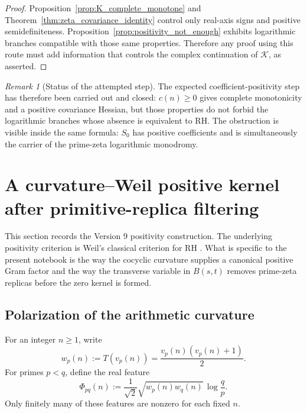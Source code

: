 \documentclass[11pt]{amsart}
\numberwithin{equation}{section}
\theoremstyle{plain}
\theoremstyle{definition}
\theoremstyle{remark}
\newtheorem{remark}[theorem]{Remark}
\begin{document}
\begin{proof}
Proposition~\ref{prop:K_complete_monotone} and
Theorem~\ref{thm:zeta_covariance_identity} control only real-axis signs
and positive semidefiniteness.  Proposition~\ref{prop:positivity_not_enough}
exhibits logarithmic branches compatible with those same properties.
Therefore any proof using this route must add information that controls the
complex continuation of \(\mathcal K\), as asserted.
\end{proof}

\begin{remark}[Status of the attempted step]
\label{rem:status_attempted_step}
The expected coefficient-positivity step has therefore been carried out and
closed: \(c(n)\ge0\) gives complete monotonicity and a positive covariance
Hessian, but those properties do not forbid the logarithmic branches whose
absence is equivalent to RH.  The obstruction is visible inside the same
formula: \(S_0\) has positive coefficients and is simultaneously the carrier
of the prime-zeta logarithmic monodromy.
\end{remark}


\section{A curvature--Weil positive kernel after primitive-replica filtering}
\label{sec:curvature_weil_kernel}

This section records the Version 9 positivity construction.  The underlying
positivity criterion is Weil's classical criterion for RH
\cite{Weil1952,Bombieri2000}.  What is specific to the present notebook is the
way the cocyclic curvature supplies a canonical positive Gram factor and the
way the transverse variable in \(B(s,t)\) removes prime-zeta replicas before
the zero kernel is formed.

\subsection{Polarization of the arithmetic curvature}
\label{subsec:curvature_polarization}

For an integer \(n\ge1\), write
\begin{equation}
w_p(n):=T(v_p(n))=\frac{v_p(n)(v_p(n)+1)}{2}.
\label{eq:curvature_weight_wp}
\end{equation}
For primes \(p<q\), define the real feature
\begin{equation}
\Phi_{pq}(n)
:=\frac{1}{\sqrt2}\sqrt{w_p(n)w_q(n)}\,\log\frac{q}{p}.
\label{eq:curvature_feature}
\end{equation}
Only finitely many of these features are nonzero for each fixed \(n\).
\end{document}
